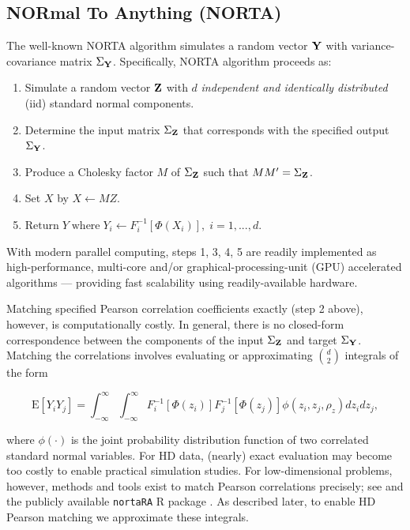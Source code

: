 \documentclass[
]{jss}
\providecommand{\tightlist}{%
  \setlength{\itemsep}{0pt}\setlength{\parskip}{0pt}}
\begin{document}
\hypertarget{normal-to-anything-norta}{%
\subsection{NORmal To Anything (NORTA)}\label{normal-to-anything-norta}}

The well-known NORTA algorithm \citep{Cario1997} simulates a random
vector \(\bf Y\) with variance-covariance matrix \(\Sigma_{\bf Y}\).
Specifically, NORTA algorithm proceeds as:


\begin{enumerate}
\def\labelenumi{\arabic{enumi}.}
\tightlist
\item
  Simulate a random vector \(\bf Z\) with \(d\) \emph{independent and
  identically distributed} (iid) standard normal components.
\item
  Determine the input matrix \(\Sigma_{\bf Z}\) that corresponds with
  the specified output \(\Sigma_{\bf Y}\).
\item
  Produce a Cholesky factor \(M\) of \(\Sigma_{\bf Z}\) such that
  \(M M^{\prime}=\Sigma_{\bf Z}\).
\item
  Set \(X\) by \(X \gets MZ\).
\item
  \(\text{Return} \; Y \; \text{where} \; Y_i \gets F_i^{-1}[\Phi(X_i)], \; i=1,...,d\).
\end{enumerate}


With modern parallel computing, steps 1, 3, 4, 5 are readily implemented
as high-performance, multi-core and/or graphical-processing-unit (GPU)
accelerated algorithms --- providing fast scalability using
readily-available hardware.

Matching specified Pearson correlation coefficients exactly (step 2
above), however, is computationally costly. In general, there is no
closed-form correspondence between the components of the input
\(\Sigma_{\bf Z}\) and target \(\Sigma_{\bf Y}\). Matching the
correlations involves evaluating or approximating \(\binom{d}{2}\)
integrals of the form

\begin{equation}
    \mathrm{E}\left[Y_i Y_j\right] = \int_{-\infty}^{\infty} \int_{-\infty}^{\infty} F_i^{-1}\left[\Phi(z_i)\right] F_j^{-1}\left[\Phi(z_j)\right] \phi(z_i, z_j, \rho_z) dz_i dz_j,
    \label{eq:pearsonIntegralRelation}
\end{equation}

where \(\phi(\cdot)\) is the joint probability distribution function of
two correlated standard normal variables. For HD data, (nearly) exact
evaluation may become too costly to enable practical simulation studies.
For low-dimensional problems, however, methods and tools exist to match
Pearson correlations precisely; see \citep{Xia17} and the publicly
available \texttt{nortaRA} R package \citep{Chen2001}. As described
later, to enable HD Pearson matching we approximate these integrals.
\end{document}
